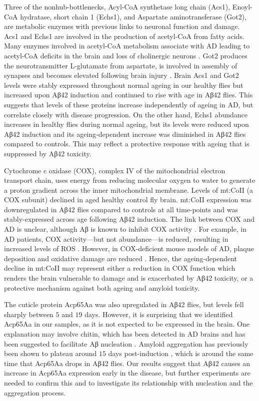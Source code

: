 Three of the nonhub-bottlenecks, Acyl-CoA synthetase long chain (Acs1), Enoyl-CoA hydratase,
short chain 1 (Echs1), and Aspartate aminotransferase (Got2),
are metabolic enzymes with previous links to neuronal function and damage.
Acs1 and Echs1 are involved in the production of acetyl-CoA from fatty acids.
Many enzymes involved in acetyl-CoA metabolism associate with AD leading to
acetyl-CoA deficits in the brain and loss of cholinergic neurons \cite{Szutowicz2013}.
Got2 produces the neurotransmitter L-glutamate from aspartate,
is involved in assembly of synapses and becomes elevated following brain injury \cite{Maas1977}.
Brain Acs1 and Got2 levels were stably expressed throughout normal ageing in our healthy
flies but increased upon Aβ42 induction and continued to rise with age in Aβ42 flies.
This suggests that levels of these proteins increase independently of ageing in AD,
but correlate closely with disease progression.
On the other hand, Echs1 abundance increases in healthy flies during normal ageing,
but its levels were reduced upon Aβ42 induction and its ageing-dependent increase
was diminished in Aβ42 flies compared to controls.
This may reflect a protective response with ageing that is suppressed by Aβ42 toxicity.

Cytochrome c oxidase (COX), complex IV of the mitochondrial electron transport chain,
uses energy from reducing molecular oxygen to water to generate a proton gradient across
the inner mitochondrial membrane.
Levels of mt:CoII (a COX subunit) declined in aged healthy control fly brain.
mt:CoII expression was downregulated in Aβ42 flies compared to controls at all time-points
and was stably-expressed across age following Aβ42 induction.
The link between COX and AD is unclear, although Aβ is known to inhibit COX activity \cite{Casley2002}.
For example, in AD patients, COX activity—but not abundance—is reduced,
resulting in increased levels of ROS \cite{Cardoso2004}.
However, in COX-deficient mouse models of AD, plaque deposition and
oxidative damage are reduced \cite{Fukui2007}.
Hence, the ageing-dependent decline in mt:CoII may represent either a reduction
in COX function which renders the brain vulnerable to damage and is exacerbated
by Aβ42 toxicity, or a protective mechanism against both ageing and amyloid toxicity.

The cuticle protein Acp65Aa was also upregulated in Aβ42 flies,
but levels fell sharply between $5$ and $19$ days.
However, it is surprising that we identified Acp65Aa in our samples,
as it is not expected to be expressed in the brain.
One explanation may involve chitin,
which has been detected in AD brains and has been suggested to facilitate Aβ nucleation \cite{Castellani2005}.
Amyloid aggregation has previously been shown to plateau around $15$ days post-induction \cite{Rogers2012},
which is around the same time that Acp65Aa drops in Aβ42 flies.
Our results suggest that Aβ42 causes an increase in Acp65Aa expression early in the disease,
but further experiments are needed to confirm this and to investigate its relationship
with nucleation and the aggregation process.

